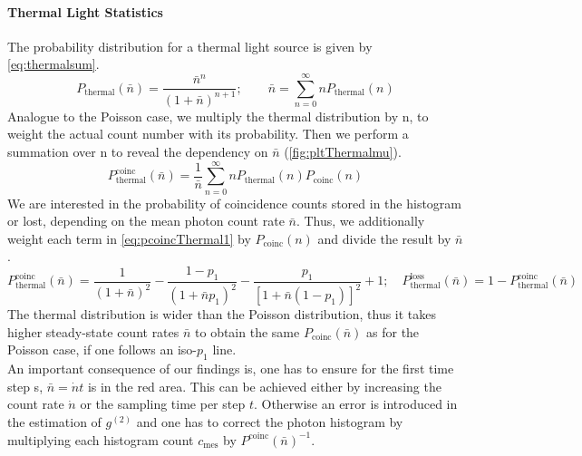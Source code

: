 \paragraph{Thermal Light Statistics}
The probability distribution for a thermal light source is given by \cref{eq:thermalsum}.
\begin{equation}\label{eq:thermalsum}
	P_\mathrm{thermal}(\bar{n})=\dfrac{\bar{n}^n}{(1+\bar{n})^{n+1}};\qquad \bar{n}=\sum_{n=0}^\infty n P_\mathrm{thermal}(n)
\end{equation}
Analogue to the Poisson case, we multiply the thermal distribution by n, to weight the actual count number with its probability. Then we perform a summation over n to reveal the dependency on $ \bar{n}$ (\cref{fig:pltThermalmu}).
\begin{equation}\label{eq:pcoincThermal1}
	P_\mathrm{thermal}^\mathrm{coinc}(\bar{n})=\dfrac{1}{\bar{n}}\sum_{n=0}^\infty n P_\mathrm{thermal}(n)P_\mathrm{coinc}(n)
\end{equation}
We are interested in the probability of coincidence counts stored in the histogram or lost, depending on the mean photon count rate $\bar{n}$. Thus, we additionally weight each term in \cref{eq:pcoincThermal1} by $P_\mathrm{coinc}(n)$ and divide the result by $\bar{n}$.
\begin{equation}\label{eq:pcoincThermal2}
	P_\mathrm{thermal}^\mathrm{coinc}(\bar{n})= \dfrac{1}{(1+\bar{n})^2}-\dfrac{1-p_1}{(1+\bar{n} p_1)^2}-\dfrac{p_1}{[1 +\bar{n}(1-p_1)]^2}+1;\quad P_\mathrm{thermal}^\mathrm{loss}( \bar{n})=1-P_\mathrm{thermal}^\mathrm{coinc}(\bar{n})
\end{equation}
The thermal distribution is wider than the Poisson distribution, thus it takes higher steady-state count rates $\bar{n}$ to obtain the same $P_\mathrm{coinc}(\bar{n})$ as for the Poisson case, if one follows an iso-$p_1$ line.\\
An important consequence of our findings is, one has to ensure for the first time step s, $\bar{n}=\dot{n}t$ is in the red area. This can be achieved either by increasing the count rate $\dot{n}$ or the sampling time per step $t$. Otherwise an error is introduced in the estimation of $g^{(2)}$ and one has to correct the photon histogram by multiplying each histogram count $c_\mathrm{mes}$ by $P^\mathrm{coinc}(\bar{n})^{-1}$. 
